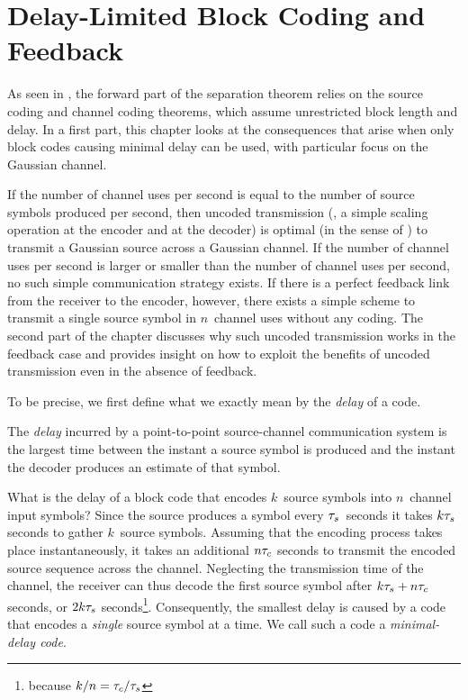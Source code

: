 \chapter{Delay-Limited Block Coding and Feedback}
\label{ch:delaygauss}

As seen in , the forward part of the separation theorem
relies on the source coding and channel coding theorems, which assume
unrestricted block length and delay. In a first part, this chapter looks at the
consequences that arise when only block codes causing minimal delay can be used,
with particular focus on the Gaussian channel. 

If the number of channel uses per second is equal to the number of source
symbols produced per second, then uncoded transmission (\ie, a simple scaling
operation at the encoder and at the decoder) is optimal (in the sense of
) to transmit a Gaussian source across a Gaussian channel. If
the number of channel uses per second is larger or smaller than the number of
channel uses per second, no such simple communication strategy exists. If there
is a perfect feedback link from the receiver to the encoder, however, there
exists a simple scheme to transmit a single source symbol in $n$~channel uses
without any coding. The second part of the chapter discusses why such uncoded
transmission works in the feedback case and provides insight on how to exploit
the benefits of uncoded transmission even in the absence of feedback.

To be precise, we first define what we exactly mean by the \emph{delay} of a
code.

\begin{definition}
  \label{def:delay}
  The \emph{delay} incurred by a point-to-point source-channel communication
  system is the largest time between the instant a source symbol is produced and
  the instant the decoder produces an estimate of that symbol. 
\end{definition}

What is the delay of a block code that encodes $k$~source symbols into
$n$~channel input symbols? Since the source produces a symbol every
${\tau_s}$~seconds it takes $k{\tau_s}$ seconds to gather $k$~source symbols. Assuming
that the encoding process takes place instantaneously, it takes an additional
$n{\tau_c}$ seconds to transmit the encoded source sequence across the channel.
Neglecting the transmission time of the channel, the receiver can thus decode
the first source symbol after $k{\tau_s} + n {\tau_c}$ seconds, or $2k{\tau_s}$
seconds\footnote{because $k/n = {\tau_c}/{\tau_s}$}. Consequently, the smallest delay is
caused by a code that encodes a \emph{single} source symbol at a time. We call
such a code a \emph{minimal-delay code}.

